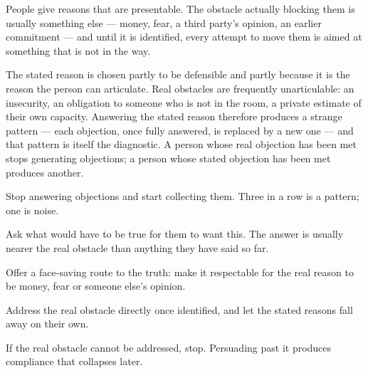 


\begin{core}
People give reasons that are presentable. The obstacle actually blocking them is usually something else --- money, fear, a third party's opinion, an earlier commitment --- and until it is identified, every attempt to move them is aimed at something that is not in the way.
\end{core}

\begin{mechanism}
The stated reason is chosen partly to be defensible and partly because it is the reason the person can articulate. Real obstacles are frequently unarticulable: an insecurity, an obligation to someone who is not in the room, a private estimate of their own capacity. Answering the stated reason therefore produces a strange pattern --- each objection, once fully answered, is replaced by a new one --- and that pattern is itself the diagnostic. A person whose real objection has been met stops generating objections; a person whose stated objection has been met produces another.
\end{mechanism}

\begin{application}
  \item Stop answering objections and start collecting them. Three in a row is a pattern; one is noise.
  \item Ask what would have to be true for them to want this. The answer is usually nearer the real obstacle than anything they have said so far.
  \item Offer a face-saving route to the truth: make it respectable for the real reason to be money, fear or someone else's opinion.
  \item Address the real obstacle directly once identified, and let the stated reasons fall away on their own.
  \item If the real obstacle cannot be addressed, stop. Persuading past it produces compliance that collapses later.
\end{application}

